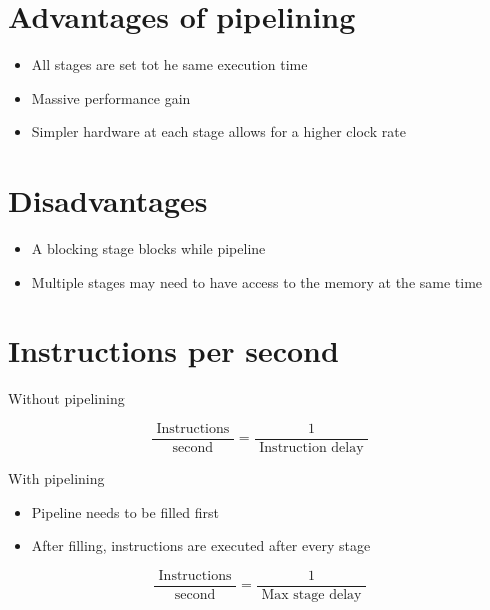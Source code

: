     \section*{Advantages of pipelining}
    \begin{itemize}
      \item All stages are set tot he same execution time
      \item Massive performance gain
      \item Simpler hardware at each stage allows for a higher clock rate
    \end{itemize}
    
    \section*{Disadvantages}
    \begin{itemize}
      \item A blocking stage blocks while pipeline
      \item Multiple stages may need to have access to the memory at the same time
    \end{itemize}
    
    \section*{Instructions per second}
    Without pipelining
    
    $$
    \frac{\text { Instructions }}{\text { second }}=\frac{1}{\text { Instruction delay }}
    $$
    
    With pipelining
    
    \begin{itemize}
      \item Pipeline needs to be filled first
      \item After filling, instructions are executed after every stage
    \end{itemize}
    
    $$
    \frac{\text { Instructions }}{\text { second }}=\frac{1}{\text { Max stage delay }}
    $$
    
